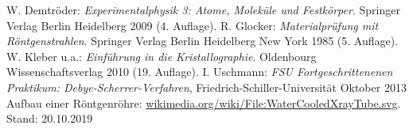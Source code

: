 \documentclass[a4paper,twoside,final]{article}
\begin{document}

\begin{thebibliography}{xxx}
	W. Demtröder: \textit{Experimentalphysik 3: Atome, Moleküle und Festkörper}. Springer Verlag Berlin Heidelberg 2009 (4. Auflage).
	R. Glocker: \textit{Materialprüfung mit Röntgenstrahlen}. Springer Verlag Berlin Heidelberg New York 1985 (5. Auflage).
	W. Kleber u.a.: \textit{Einführung in die Kristallographie}. Oldenbourg Wissenschaftsverlag 2010 (19. Auflage).
  I. Uschmann: \textit{FSU Fortgeschrittenenen Praktikum: Debye-Scherrer-Verfahren}, Fried\-rich-Schil\-ler-Uni\-versi\-tät Oktober 2013
  Aufbau einer Röntgenröhre: \url{wikimedia.org/wiki/File:WaterCooledXrayTube.svg}. Stand: 20.10.2019
\end{thebibliography}
\end{document}

